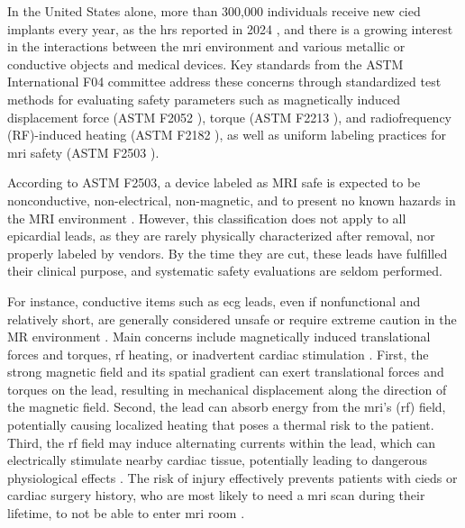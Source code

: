 In the United States alone, more than 300,000 individuals receive new \gls{cied} implants every year, as the \gls{hrs} reported in 2024 \cite{HRS2024_CIEDs}, and there is a growing interest in the interactions between the \gls{mri} environment and various metallic or conductive objects and medical devices. Key standards from the ASTM International F04 committee address these concerns through standardized test methods for evaluating safety parameters such as magnetically induced displacement force (ASTM F2052 \cite{astmF2052}), torque (ASTM F2213 \cite{astm2213}), and radiofrequency (RF)-induced heating (ASTM F2182 \cite{astmF2182}), as well as uniform labeling practices for \gls{mri} safety (ASTM F2503 \cite{ASTM_F2503_2023}).

According to ASTM F2503, a device labeled as MRI safe is expected to be nonconductive, non-electrical, non-magnetic, and to present no known hazards in the MRI environment \cite{ASTM_F2503_2023}. However, this classification does not apply to all epicardial leads, as they are rarely physically characterized after removal, nor properly labeled by vendors. By the time they are cut, these leads have fulfilled their clinical purpose, and systematic safety evaluations are seldom performed.

For instance, conductive items such as \gls{ecg} leads, even if nonfunctional and relatively short, are generally considered unsafe or require extreme caution in the MR environment \cite{Hartnell_AJR_1997,mrisafety_175,mrisafety_186}. Main concerns include magnetically induced translational forces and torques, \gls{rf} heating, or inadvertent cardiac stimulation \cite{poh2017,muthalaly2018,ACC_2024_MRI_CIEDs}. First, the strong magnetic field and its spatial gradient can exert translational forces and torques on the lead, resulting in mechanical displacement along the direction of the magnetic field. Second, the lead can absorb energy from the \gls{mri}’s (\gls{rf}) field, potentially causing localized heating that poses a thermal risk to the patient. Third, the \gls{rf} field may induce alternating currents within the lead, which can electrically stimulate nearby cardiac tissue, potentially leading to dangerous physiological effects \cite{Schenck2000}. The risk of injury effectively prevents patients with \glspl{cied} or cardiac surgery history, who are most likely to need a \gls{mri} scan during their lifetime, to not be able to enter \gls{mri} room \cite{Hartnell_AJR_1997, panych2018}. 

